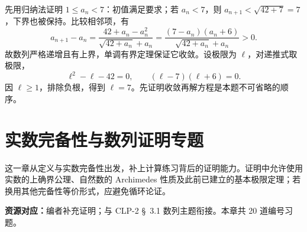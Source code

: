 \documentclass[UTF8,12pt,a4paper,fontset=fandol]{ctexart}
\begin{document}
\begin{solve}\label{ans:c1q24}
先用归纳法证明 $1\le a_n<7$：初值满足要求；若 $a_n<7$，则 $a_{n+1}<\sqrt{42+7}=7$，下界也被保持。比较相邻项，有
\[
a_{n+1}-a_n=\frac{42+a_n-a_n^2}{\sqrt{42+a_n}+a_n}=\frac{(7-a_n)(a_n+6)}{\sqrt{42+a_n}+a_n}>0.
\]
故数列严格递增且有上界，单调有界定理保证它收敛。设极限为 $\ell$，对递推式取极限，
\[
\ell^2-\ell-42=0,\qquad(\ell-7)(\ell+6)=0.
\]
因 $\ell\ge1$，排除负根，得到 $\ell=7$。先证明收敛再解方程是本题不可省略的顺序。
\end{solve}

\clearpage
\section{实数完备性与数列证明专题}\label{sec:ch2}
这一章从定义与实数完备性出发，补上计算练习背后的证明能力。证明中允许使用实数的上确界公理、自然数的 Archimedes 性质及此前已建立的基本极限定理；若换用其他完备性等价形式，应避免循环论证。

\textbf{资源对应：}编者补充证明；与 CLP-2 \S~3.1 数列主题衔接。本章共 20 道编号习题。
\end{document}
